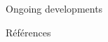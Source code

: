 \documentclass[final, hyperref, table]{beamer}
\begin{document}
\begin{frame}[containsverbatim]{}
\begin{columns}[T]
\begin{column}[T]{.49\linewidth}
\begin{block}{Ongoing developments}
  \end{block}
\begin{block}{Références}\tiny

\vspace{-1cm}
\begin{multicols}{2}[]

\end{multicols}
\end{block}
  
\end{column}
\end{columns}
\end{frame}
\end{document}
